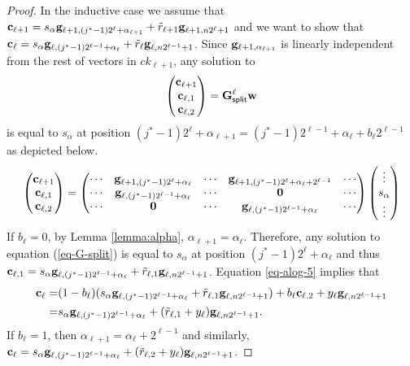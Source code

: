 \begin{proof}
In the inductive case we assume that \(\mathbf{c}_{\ell+1}=s_{\alpha}\mathbf{g}_{\ell+1,(j^*-1)2^\ell+\alpha_{\ell+1}}+\tilde{r}_{\ell+1}\mathbf{g}_{\ell+1,n2^\ell+1}\) and we want to show that $\mathbf{c}_\ell = s_\alpha\mathbf{g}_{\ell,(j^*-1)2^{\ell-1}+\alpha_\ell}+\tilde{r}_\ell\mathbf{g}_{\ell,n2^{\ell-1}+1}$. Since \(\mathbf{g}_{\ell+1,\alpha_{\ell+1}}\) is linearly independent from the rest of vectors in \(ck_{\ell+1}\), any solution to 
\begin{equation}
\begin{pmatrix}\mathbf{c}_{\ell+1}\\\mathbf{c}_{\ell,1}\\\mathbf{c}_{\ell,2}\end{pmatrix}=\mathbf{{G}}^{\ell}_{\mathsf{split}}\mathbf{w} \label{eq-G-split}
\end{equation}
is equal to \(s_{\alpha}\) at position \((j^*-1)2^{\ell}+\alpha_{\ell+1}=(j^*-1)2^{\ell-1}+\alpha_\ell+b_\ell2^{\ell-1}\) as depicted below.
\begin{align*}
\left(\begin{matrix}\mathbf{c}_{\ell+1}\\\mathbf{c}_{\ell,1}\\\mathbf{c}_{\ell,2}\end{matrix}\right)=
\left(\begin{matrix}
\cdots & \mathbf{g}_{\ell+1,(j^*-1)2^{\ell}+\alpha_\ell} & \cdots  & \mathbf{g}_{\ell+1,(j^*-1)2^{\ell}+\alpha_\ell+2^{\ell-1}} & \cdots\\
\cdots & \mathbf{g}_{\ell,(j^*-1)2^{\ell-1}+\alpha_\ell}     & \cdots  & \mathbf{0}                           & \cdots\\
\cdots & \mathbf{0}                        & \cdots  & \mathbf{g}_{\ell,(j^*-1)2^{\ell-1}+\alpha_\ell}        & \cdots
\end{matrix}\right)
\left(\begin{matrix}\vdots\\s_\alpha\\\vdots\end{matrix}\right)
\end{align*}
If $b_{\ell}=0$, by Lemma \ref{lemma:alpha}, $\alpha_{\ell+1}=\alpha_\ell$. Therefore, any solution to equation (\ref{eq-G-split})
 is equal to $s_\alpha$ at position $(j^*-1)2^{\ell}+\alpha_\ell$ and thus $\mathbf{c}_{\ell,1} = s_\alpha\mathbf{g}_{\ell,(j^*-1)2^{\ell-1}+\alpha_\ell}+\tilde{r}_{\ell,1}\mathbf{g}_{\ell,n2^{\ell-1}+1}$.
Equation \ref{eq-alog-5} implies that
\begin{align*}
\mathbf{c}_{\ell}=&(1-b_\ell)(s_\alpha\mathbf{g}_{\ell,(j^*-1)2^{\ell-1}+\alpha_\ell}+\tilde{r}_{\ell,1}\mathbf{g}_{\ell,n2^{\ell-1}+1})+b_\ell\mathbf{c}_{\ell,2}+y_\ell\mathbf{g}_{\ell,n2^{\ell-1}+1}\\
               =& s_\alpha\mathbf{g}_{\ell,(j^*-1)2^{\ell-1}+\alpha_\ell}+(\tilde{r}_{\ell,1}+y_\ell)\mathbf{g}_{\ell,n2^{\ell-1}+1}.
\end{align*}
If $b_{\ell}=1$, then $\alpha_{\ell+1}=\alpha_\ell+2^{\ell-1}$ and similarly, $\mathbf{c}_{\ell}=s_\alpha\mathbf{g}_{\ell,(j^*-1)2^{\ell-1}+\alpha_\ell}+(\tilde{r}_{\ell,2}+y_\ell)\mathbf{g}_{\ell,n2^{\ell-1}+1}$.

\end{proof}
